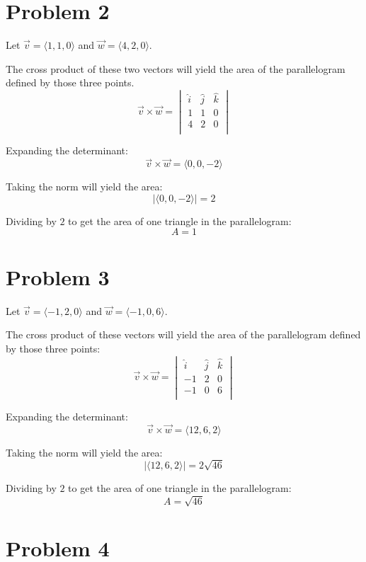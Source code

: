 \documentclass{article}
\begin{document}
\section*{Problem 2}

Let $\vec{v} = \langle 1, 1, 0 \rangle$ and $\vec{w} = \langle 4, 2, 0 \rangle$. 

\bigbreak

The cross product of these two vectors will yield the area of the parallelogram
defined by those three points. 
$$ \vec{v} \times \vec{w} = 
\begin{vmatrix}
  \hat{i} & \hat{j} & \hat{k} \\
  1 & 1 & 0 \\
  4 & 2 & 0 \\
\end{vmatrix} $$

Expanding the determinant:
$$ \vec{v} \times \vec{w} = \langle 0, 0, -2 \rangle $$

Taking the norm will yield the area:
$$ \vert \langle 0, 0, -2 \rangle \vert = 2 $$

Dividing by $2$ to get the area of one triangle in the parallelogram:
$$ A = 1 $$

\section*{Problem 3}

Let $\vec{v} = \langle -1, 2, 0 \rangle$ and $\vec{w} = \langle -1, 0, 6
\rangle$.

\bigbreak

The cross product of these vectors will yield the area of the parallelogram
defined by those three points:
$$ \vec{v} \times \vec{w} = 
\begin{vmatrix}
  \hat{i} & \hat{j} & \hat{k} \\
  -1 & 2 & 0 \\
  -1 & 0 & 6 \\
\end{vmatrix} $$

Expanding the determinant:
$$ \vec{v} \times \vec{w} = \langle 12, 6, 2 \rangle $$

Taking the norm will yield the area:
$$ \vert \langle 12, 6, 2 \rangle \vert = 2 \sqrt{46} $$

Dividing by $2$ to get the area of one triangle in the parallelogram:
$$ A = \sqrt{46} $$

\section*{Problem 4}
\end{document}
